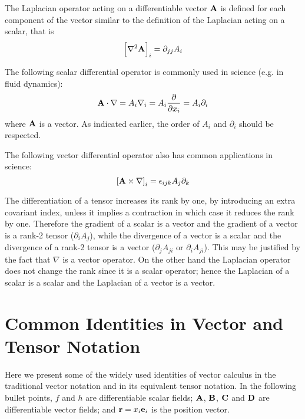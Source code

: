  The Laplacian operator acting on a differentiable vector
$\mathbf{ A}$ is defined for each component of the vector similar
to the definition of the Laplacian acting on a scalar, that is
\begin{equation}
\left[\nabla^{2}\mathbf{ A}\right]_{i}=\partial_{jj}A_{i}\label{eqLaplacian2}
\end{equation}


 The following scalar differential operator is commonly
used in science (e.g. in fluid dynamics):
\begin{equation}
\mathbf{ A}\cdot\nabla=A_{i}\nabla_{i}=A_{i}\dfrac{\partial}{\partial 
x_{i}}=A_{i}\partial_{i}\label{eqANabla}
\end{equation}
where $\mathbf{ A}$ is a vector. As indicated earlier, the order of
$A_{i}$ and $\partial_{i}$ should be respected.

 The following vector differential operator also has common
applications in science:
\begin{equation}
\left[\mathbf{ A}\times\nabla\right]_{i}=\epsilon_{ijk}A_{j}\partial_{k}
\end{equation}


 The differentiation of a tensor increases its rank by one,
by introducing an extra covariant index, unless it implies a contraction
in which case it reduces the rank by one. Therefore the gradient of
a scalar is a vector and the gradient of a vector is a rank-2 tensor
($\partial_{i}A_{j}$), while the divergence of a vector is a scalar
and the divergence of a rank-2 tensor is a vector ($\partial_{j}A_{ji}$
or $\partial_{i}A_{ji}$). This may be justified by the fact that
$\nabla$ is a vector operator. On the other hand the Laplacian operator
does not change the rank since it is a scalar operator; hence the
Laplacian of a scalar is a scalar and the Laplacian of a vector is
a vector.





\section{Common Identities in Vector and Tensor Notation}

 Here we present some of the widely used identities of vector
calculus in the traditional vector notation and in its equivalent
tensor notation. In the following bullet points, $f$ and $h$ are
differentiable scalar fields; $\mathbf{ A}$, $\mathbf{ B}$, $\mathbf{ C}$
and $\mathbf{ D}$ are differentiable vector fields; and 
$\mathbf{ r}=x_{i}\mathbf{ e}_{i}$
is the position vector.


